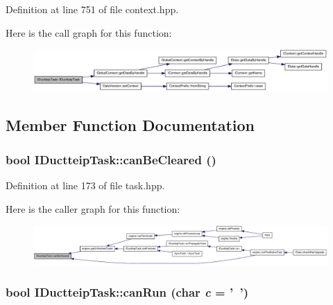 Definition at line 751 of file context.hpp.

Here is the call graph for this function:\nopagebreak
\begin{figure}[H]
\begin{center}
\leavevmode
\includegraphics[width=420pt]{class_i_ductteip_task_a9829e9023aab8fa4bc8e54f0064fff9a_cgraph}
\end{center}
\end{figure}


\subsection{Member Function Documentation}
\hypertarget{class_i_ductteip_task_af7aba4ca30458f6d2c7bb2834406198f}{
\subsubsection[{canBeCleared}]{\setlength{\rightskip}{0pt plus 5cm}bool IDuctteipTask::canBeCleared ()}}
\label{class_i_ductteip_task_af7aba4ca30458f6d2c7bb2834406198f}


Definition at line 173 of file task.hpp.

Here is the caller graph for this function:\nopagebreak
\begin{figure}[H]
\begin{center}
\leavevmode
\includegraphics[width=420pt]{class_i_ductteip_task_af7aba4ca30458f6d2c7bb2834406198f_icgraph}
\end{center}
\end{figure}
\hypertarget{class_i_ductteip_task_ad30ebd78861e6d0e7647a79393ccbcab}{
\subsubsection[{canRun}]{\setlength{\rightskip}{0pt plus 5cm}bool IDuctteipTask::canRun (char {\em c} = {\ttfamily '~'})}}
\label{class_i_ductteip_task_ad30ebd78861e6d0e7647a79393ccbcab}


